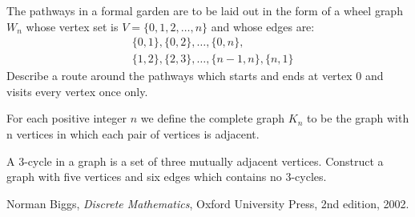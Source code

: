 \begin{questions}
\question
The pathways in a formal garden are to be laid out in the form of a wheel graph $W_n$ whose vertex set is $V = \{0,1,2,\ldots,n\}$ and whose edges are:
\begin{align*}
	&\{0,1\}, \{0,2\}, \ldots, \{0,n\}, \\
	&\{1,2\}, \{2,3\}, \ldots, \{n-1,n\}, \{n,1\}
\end{align*}
Describe a route around the pathways which starts and ends at vertex 0 and visits every vertex once only.~\cite{biggs02}

\question
For each positive integer $n$ we define the complete graph $K_n$ to be the graph with n vertices in which each pair of vertices is adjacent.~\cite{biggs02}

\question
A 3-cycle in a graph is a set of three mutually adjacent vertices.
Construct a graph with five vertices and six edges which contains no 3-cycles.~\cite{biggs02}

\end{questions}

\begin{thebibliography}{9}

  Norman Biggs,
  \emph{Discrete Mathematics},
  Oxford University Press,
  2nd edition,
  2002.

\end{thebibliography}
